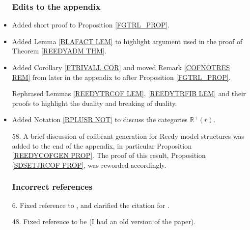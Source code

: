 \documentclass{article}
\begin{document}
\begin{itemize}


      
      
      \subsubsection*{Edits to the appendix}      
      
\item Added short proof to Proposition \ref{FGTRL_PROP}. %

\item Added Lemma \ref{BLAFACT LEM} to highlight argument used in the proof of Theorem \ref{REEDYADM THM}.
            
\item Added Corollary \ref{FTRIVALL COR} and moved Remark \ref{COFNOTRES REM} from later in the appendix to after Proposition \ref{FGTRL_PROP}.

      Rephrased Lemmas \ref{REEDYTRCOF LEM}, \ref{REEDYTRFIB LEM} and their proofs to highlight the duality and breaking of duality.
      
\item Added Notation \ref{RPLUSR NOT} to discuss the categories $\mathbb R^+(r)$.
      
\item[58.] A brief discussion of cofibrant generation for Reedy model structures was added to the end of the appendix, in particular Proposition \ref{REEDYCOFGEN PROP}. The proof of this result, Proposition \ref{SDSETJRCOF PROP}, was reworded accordingly. %


      

      \subsubsection*{Incorrect references}
      
\item[6.] Fixed reference \cite[Prop. 3.21]{BP17} to \cite[Prop. 3.23]{BP17}, and clarified the citation for \cite{BP17}.

\item[48.] Fixed reference \cite[Prop. 3.4.18]{Hir03} to be \cite[Thm. 3.3.18]{Hir03} (I had an old version of the paper).
      

\end{itemize}
\end{document}
